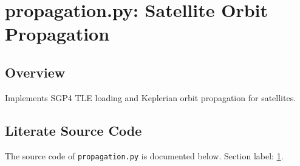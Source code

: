 \documentclass[10pt,a4paper]{report}
\begin{document}
\chapter{propagation.py: Satellite Orbit Propagation}
\label{sec:propagation}

\section*{Overview}
Implements SGP4 TLE loading and Keplerian orbit propagation for satellites.

\section*{Literate Source Code}
The source code of \texttt{propagation.py} is documented below. Section label: \ref{sec:propagation}.
\end{document}
